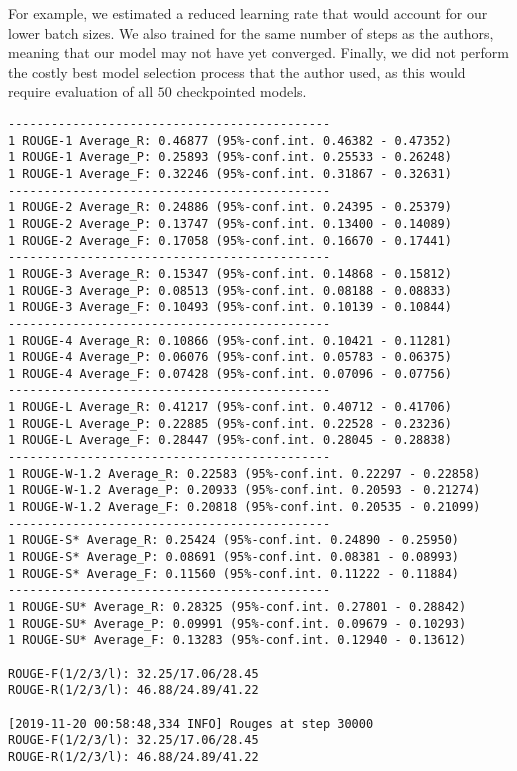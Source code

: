 \documentclass[12pt]{article}
\begin{document}
For example, we estimated a reduced learning rate that would account
for our lower batch sizes. We also trained for the same number of
steps as the authors, meaning that our model may not have yet
converged. Finally, we did not perform the costly best model selection
process that the author used, as this would require evaluation of all
$50$ checkpointed models.

\begin{verbatim}
---------------------------------------------
1 ROUGE-1 Average_R: 0.46877 (95%-conf.int. 0.46382 - 0.47352)
1 ROUGE-1 Average_P: 0.25893 (95%-conf.int. 0.25533 - 0.26248)
1 ROUGE-1 Average_F: 0.32246 (95%-conf.int. 0.31867 - 0.32631)
---------------------------------------------
1 ROUGE-2 Average_R: 0.24886 (95%-conf.int. 0.24395 - 0.25379)
1 ROUGE-2 Average_P: 0.13747 (95%-conf.int. 0.13400 - 0.14089)
1 ROUGE-2 Average_F: 0.17058 (95%-conf.int. 0.16670 - 0.17441)
---------------------------------------------
1 ROUGE-3 Average_R: 0.15347 (95%-conf.int. 0.14868 - 0.15812)
1 ROUGE-3 Average_P: 0.08513 (95%-conf.int. 0.08188 - 0.08833)
1 ROUGE-3 Average_F: 0.10493 (95%-conf.int. 0.10139 - 0.10844)
---------------------------------------------
1 ROUGE-4 Average_R: 0.10866 (95%-conf.int. 0.10421 - 0.11281)
1 ROUGE-4 Average_P: 0.06076 (95%-conf.int. 0.05783 - 0.06375)
1 ROUGE-4 Average_F: 0.07428 (95%-conf.int. 0.07096 - 0.07756)
---------------------------------------------
1 ROUGE-L Average_R: 0.41217 (95%-conf.int. 0.40712 - 0.41706)
1 ROUGE-L Average_P: 0.22885 (95%-conf.int. 0.22528 - 0.23236)
1 ROUGE-L Average_F: 0.28447 (95%-conf.int. 0.28045 - 0.28838)
---------------------------------------------
1 ROUGE-W-1.2 Average_R: 0.22583 (95%-conf.int. 0.22297 - 0.22858)
1 ROUGE-W-1.2 Average_P: 0.20933 (95%-conf.int. 0.20593 - 0.21274)
1 ROUGE-W-1.2 Average_F: 0.20818 (95%-conf.int. 0.20535 - 0.21099)
---------------------------------------------
1 ROUGE-S* Average_R: 0.25424 (95%-conf.int. 0.24890 - 0.25950)
1 ROUGE-S* Average_P: 0.08691 (95%-conf.int. 0.08381 - 0.08993)
1 ROUGE-S* Average_F: 0.11560 (95%-conf.int. 0.11222 - 0.11884)
---------------------------------------------
1 ROUGE-SU* Average_R: 0.28325 (95%-conf.int. 0.27801 - 0.28842)
1 ROUGE-SU* Average_P: 0.09991 (95%-conf.int. 0.09679 - 0.10293)
1 ROUGE-SU* Average_F: 0.13283 (95%-conf.int. 0.12940 - 0.13612)

ROUGE-F(1/2/3/l): 32.25/17.06/28.45
ROUGE-R(1/2/3/l): 46.88/24.89/41.22

[2019-11-20 00:58:48,334 INFO] Rouges at step 30000
ROUGE-F(1/2/3/l): 32.25/17.06/28.45
ROUGE-R(1/2/3/l): 46.88/24.89/41.22
\end{verbatim}
\end{document}

